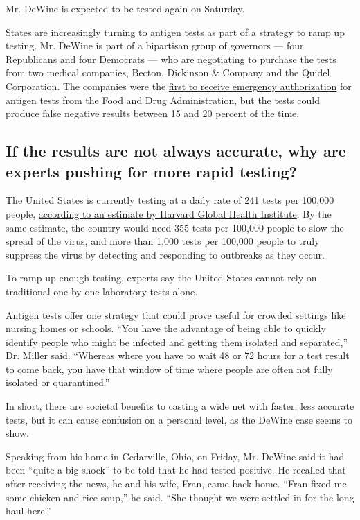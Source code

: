 Mr. DeWine is expected to be tested again on Saturday.

States are increasingly turning to antigen tests as part of a strategy
to ramp up testing. Mr. DeWine is part of a bipartisan group of
governors --- four Republicans and four Democrats --- who are
negotiating to purchase the tests from two medical companies, Becton,
Dickinson \& Company and the Quidel Corporation. The companies were the
\href{https://www.nytimes.com/2020/07/06/health/fast-coronavirus-tests.html}{first
to receive emergency authorization} for antigen tests from the Food and
Drug Administration, but the tests could produce false negative results
between 15 and 20 percent of the time.

\hypertarget{if-the-results-are-not-always-accurate-why-are-experts-pushing-for-more-rapid-testing}{%
\subsection{If the results are not always accurate, why are experts
pushing for more rapid
testing?}\label{if-the-results-are-not-always-accurate-why-are-experts-pushing-for-more-rapid-testing}}

The United States is currently testing at a daily rate of 241 tests per
100,000 people,
\href{https://globalepidemics.org/july-6-2020-state-testing-targets/}{according
to an estimate by Harvard Global Health Institute}. By the same
estimate, the country would need 355 tests per 100,000 people to slow
the spread of the virus, and more than 1,000 tests per 100,000 people to
truly suppress the virus by detecting and responding to outbreaks as
they occur.

To ramp up enough testing, experts say the United States cannot rely on
traditional one-by-one laboratory tests alone.

Antigen tests offer one strategy that could prove useful for crowded
settings like nursing homes or schools. ``You have the advantage of
being able to quickly identify people who might be infected and getting
them isolated and separated,'' Dr. Miller said. ``Whereas where you have
to wait 48 or 72 hours for a test result to come back, you have that
window of time where people are often not fully isolated or
quarantined.''

In short, there are societal benefits to casting a wide net with faster,
less accurate tests, but it can cause confusion on a personal level, as
the DeWine case seems to show.

Speaking from his home in Cedarville, Ohio, on Friday, Mr. DeWine said
it had been ``quite a big shock'' to be told that he had tested
positive. He recalled that after receiving the news, he and his wife,
Fran, came back home. ``Fran fixed me some chicken and rice soup,'' he
said. ``She thought we were settled in for the long haul here.''

